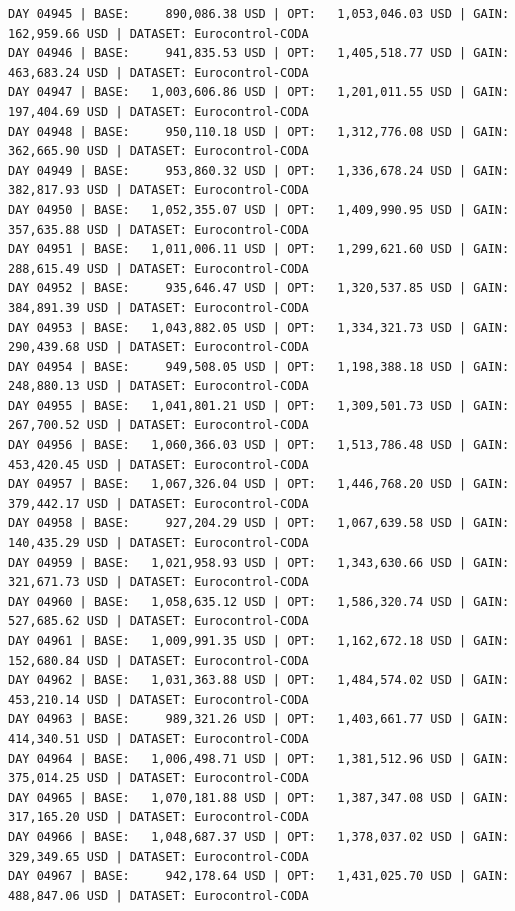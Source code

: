 \documentclass[11pt,a4paper]{article}
\begin{document}
\begin{verbatim}
DAY 04945 | BASE:     890,086.38 USD | OPT:   1,053,046.03 USD | GAIN: 162,959.66 USD | DATASET: Eurocontrol-CODA
DAY 04946 | BASE:     941,835.53 USD | OPT:   1,405,518.77 USD | GAIN: 463,683.24 USD | DATASET: Eurocontrol-CODA
DAY 04947 | BASE:   1,003,606.86 USD | OPT:   1,201,011.55 USD | GAIN: 197,404.69 USD | DATASET: Eurocontrol-CODA
DAY 04948 | BASE:     950,110.18 USD | OPT:   1,312,776.08 USD | GAIN: 362,665.90 USD | DATASET: Eurocontrol-CODA
DAY 04949 | BASE:     953,860.32 USD | OPT:   1,336,678.24 USD | GAIN: 382,817.93 USD | DATASET: Eurocontrol-CODA
DAY 04950 | BASE:   1,052,355.07 USD | OPT:   1,409,990.95 USD | GAIN: 357,635.88 USD | DATASET: Eurocontrol-CODA
DAY 04951 | BASE:   1,011,006.11 USD | OPT:   1,299,621.60 USD | GAIN: 288,615.49 USD | DATASET: Eurocontrol-CODA
DAY 04952 | BASE:     935,646.47 USD | OPT:   1,320,537.85 USD | GAIN: 384,891.39 USD | DATASET: Eurocontrol-CODA
DAY 04953 | BASE:   1,043,882.05 USD | OPT:   1,334,321.73 USD | GAIN: 290,439.68 USD | DATASET: Eurocontrol-CODA
DAY 04954 | BASE:     949,508.05 USD | OPT:   1,198,388.18 USD | GAIN: 248,880.13 USD | DATASET: Eurocontrol-CODA
DAY 04955 | BASE:   1,041,801.21 USD | OPT:   1,309,501.73 USD | GAIN: 267,700.52 USD | DATASET: Eurocontrol-CODA
DAY 04956 | BASE:   1,060,366.03 USD | OPT:   1,513,786.48 USD | GAIN: 453,420.45 USD | DATASET: Eurocontrol-CODA
DAY 04957 | BASE:   1,067,326.04 USD | OPT:   1,446,768.20 USD | GAIN: 379,442.17 USD | DATASET: Eurocontrol-CODA
DAY 04958 | BASE:     927,204.29 USD | OPT:   1,067,639.58 USD | GAIN: 140,435.29 USD | DATASET: Eurocontrol-CODA
DAY 04959 | BASE:   1,021,958.93 USD | OPT:   1,343,630.66 USD | GAIN: 321,671.73 USD | DATASET: Eurocontrol-CODA
DAY 04960 | BASE:   1,058,635.12 USD | OPT:   1,586,320.74 USD | GAIN: 527,685.62 USD | DATASET: Eurocontrol-CODA
DAY 04961 | BASE:   1,009,991.35 USD | OPT:   1,162,672.18 USD | GAIN: 152,680.84 USD | DATASET: Eurocontrol-CODA
DAY 04962 | BASE:   1,031,363.88 USD | OPT:   1,484,574.02 USD | GAIN: 453,210.14 USD | DATASET: Eurocontrol-CODA
DAY 04963 | BASE:     989,321.26 USD | OPT:   1,403,661.77 USD | GAIN: 414,340.51 USD | DATASET: Eurocontrol-CODA
DAY 04964 | BASE:   1,006,498.71 USD | OPT:   1,381,512.96 USD | GAIN: 375,014.25 USD | DATASET: Eurocontrol-CODA
DAY 04965 | BASE:   1,070,181.88 USD | OPT:   1,387,347.08 USD | GAIN: 317,165.20 USD | DATASET: Eurocontrol-CODA
DAY 04966 | BASE:   1,048,687.37 USD | OPT:   1,378,037.02 USD | GAIN: 329,349.65 USD | DATASET: Eurocontrol-CODA
DAY 04967 | BASE:     942,178.64 USD | OPT:   1,431,025.70 USD | GAIN: 488,847.06 USD | DATASET: Eurocontrol-CODA

\end{verbatim}
\end{document}
